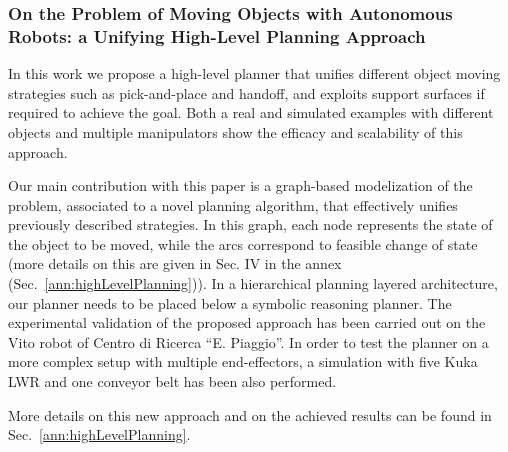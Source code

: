 
\subsubsection{On the Problem of Moving Objects with Autonomous Robots: a Unifying High-Level Planning Approach}
\label{sec:HighLevelPlanning}

In this work we propose a high-level planner that unifies
different object moving strategies such as pick-and-place and
handoff, and exploits support surfaces if required to achieve
the goal. Both a real and simulated examples with different
objects and multiple manipulators show the efficacy and scalability of this approach.

Our main contribution with this paper is a graph-based modelization of the problem, associated to a novel planning algorithm, that effectively unifies previously described strategies.
In this graph, each node represents the state of the object to be moved, while the arcs correspond to feasible change of state (more details on this are given in Sec. IV in the annex (Sec.~\ref{ann:highLevelPlanning})). In a hierarchical planning layered architecture, our planner needs to be placed below a symbolic reasoning planner.
The experimental validation of the proposed approach has been carried out on the Vito robot of Centro di Ricerca ``E. Piaggio''. In order to test the planner on a more complex setup with multiple end-effectors, a simulation with five Kuka LWR and one conveyor belt has been also performed.

More details on this new approach and on the achieved results can be found in Sec.~\ref{ann:highLevelPlanning}.

